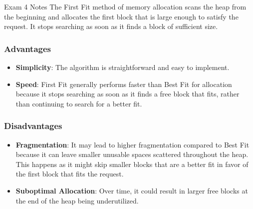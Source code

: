 \begin{examnotes}{Exam 4 Notes}
    The First Fit method of memory allocation scans the heap from the beginning and allocates the first block that is large enough to satisfy the request. It stops searching as soon as it finds a 
    block of sufficient size.

    \subsubsection*{Advantages}

    \begin{itemize}
        \item \textbf{Simplicity}: The algorithm is straightforward and easy to implement.
        \item \textbf{Speed}: First Fit generally performs faster than Best Fit for allocation because it stops searching as soon as it finds a free block that fits, rather than continuing to search for a better fit.
    \end{itemize}

    \subsubsection*{Disadvantages}

    \begin{itemize}
        \item \textbf{Fragmentation}: It may lead to higher fragmentation compared to Best Fit because it can leave smaller unusable spaces scattered throughout the heap. This happens as it might skip 
        smaller blocks that are a better fit in favor of the first block that fits the request.
        \item \textbf{Suboptimal Allocation}: Over time, it could result in larger free blocks at the end of the heap being underutilized.
    \end{itemize}
\end{examnotes}
